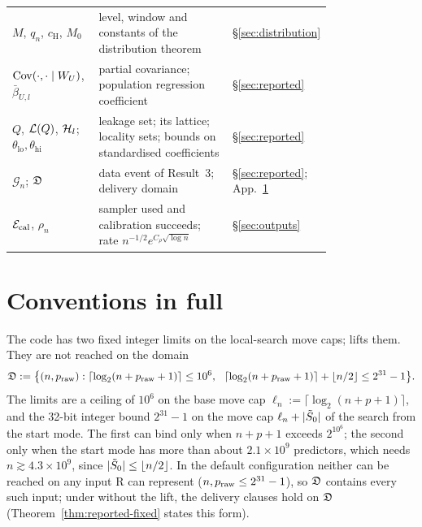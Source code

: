 \begin{longtable}{@{}p{0.28\linewidth}p{0.5\linewidth}l@{}}
$M$, $q_n$, $c_{\mathrm H}$, $M_0$ & level, window and constants of the distribution theorem & \S\ref{sec:distribution} \\
$\operatorname{Cov}(\cdot,\cdot\mid W_U)$, $\bar\beta_{U,l}$ & partial covariance; population regression coefficient & \S\ref{sec:reported} \\
$Q$, $\mathcal L(Q)$, $\mathcal H_l$; $\theta_{\mathrm{lo}},\theta_{\mathrm{hi}}$ & leakage set; its lattice; locality sets; bounds on standardised coefficients & \S\ref{sec:reported} \\
$\mathcal G_n$; $\mathfrak D$ & data event of Result~3; delivery domain & \S\ref{sec:reported}; App.~\ref{app:conventions} \\
$\mathcal E_{\mathrm{cal}}$, $\rho_n$ & sampler used and calibration succeeds; rate $n^{-1/2}e^{C_\rho\sqrt{\log n}}$ & \S\ref{sec:outputs} \\
\bottomrule
\end{longtable}

\section{Conventions in full}\label{app:conventions}

The code has two fixed integer limits on the local-search move caps;  lifts them. They are not reached on the
domain
\[
  \Dom:=\big\{(n,\praw):\lceil\log_2(n+\praw+1)\rceil\le10^6,\ \ \lceil\log_2(n+\praw+1)\rceil+\lfloor n/2\rfloor\le2^{31}-1\big\}.
\]
The limits are a ceiling of $10^6$ on the base move cap $\ell_n:=\lceil\log_2(n+p+1)\rceil$, and the 32-bit integer bound
$2^{31}-1$ on the move cap $\ell_n+\lvert \tilde S_0\rvert$ of the search from the start mode. The first can bind only when $n+p+1$
exceeds $2^{10^6}$; the second only when the start mode has more than about $2.1\times10^9$ predictors, which needs
$n\gtrsim4.3\times10^9$, since $\lvert \tilde S_0\rvert\le\lfloor n/2\rfloor$. In the default configuration neither can be reached on
any input R can represent ($n,p_{\mathrm{raw}}\le2^{31}-1$), so $\mathfrak D$ contains every such input; under  without the lift,
the delivery clauses hold on $\mathfrak D$ (Theorem~\ref{thm:reported-fixed} states this form).

